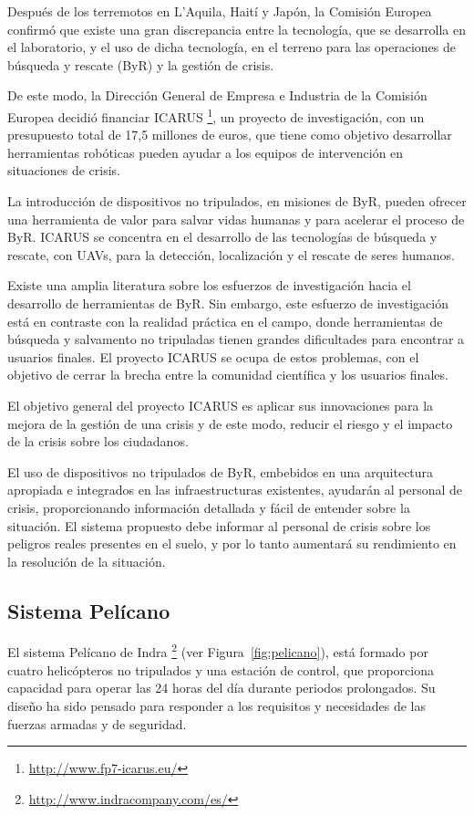 Después de los terremotos en L'Aquila, Haití y Japón, la Comisión Europea confirmó que existe una gran discrepancia entre la tecnología, que se desarrolla en el laboratorio, y el uso de dicha tecnología, en el terreno para las operaciones de búsqueda y rescate (\acs{ByR}) y la gestión de crisis.

De este modo, la Dirección General de Empresa e Industria de la Comisión Europea decidió financiar ICARUS \footnote{\url{http://www.fp7-icarus.eu/}}, un proyecto de investigación, con un presupuesto total de 17,5 millones de euros, que tiene como objetivo desarrollar herramientas robóticas pueden ayudar a los equipos de intervención en situaciones de crisis.

La introducción de dispositivos no tripulados, en misiones de \acs{ByR}, pueden ofrecer una herramienta de valor para salvar vidas humanas y para acelerar el proceso de \acs{ByR}. ICARUS se concentra en el desarrollo de las tecnologías de búsqueda y rescate, con \acs{UAV}s, para la detección, localización y el rescate de seres humanos.

Existe una amplia literatura sobre los esfuerzos de investigación hacia el desarrollo de herramientas de \acs{ByR}. Sin embargo, este esfuerzo de investigación está en contraste con la realidad práctica en el campo, donde herramientas de búsqueda y salvamento no tripuladas tienen grandes dificultades para encontrar a usuarios finales. El proyecto ICARUS se ocupa de estos problemas, con el objetivo de cerrar la brecha entre la comunidad científica y los usuarios finales.

El objetivo general del proyecto ICARUS es aplicar sus innovaciones para la mejora de la gestión de una crisis y de este modo, reducir el riesgo y el impacto de la crisis sobre los ciudadanos. 

El uso de dispositivos no tripulados de \acs{ByR}, embebidos en una arquitectura apropiada e integrados en las infraestructuras existentes, ayudarán al personal de crisis, proporcionando información detallada y fácil de entender sobre la situación. El sistema propuesto debe informar al personal de crisis sobre los peligros reales presentes en el suelo, y por lo tanto aumentará su rendimiento en la resolución de la situación.

\subsection{Sistema Pelícano}
\label{sec:pelicano}

El sistema Pelícano de Indra \footnote{\url{http://www.indracompany.com/es/}} (ver Figura~\ref{fig:pelicano}), está formado por cuatro helicópteros no tripulados y una estación de control, que proporciona capacidad para operar las 24 horas del día durante periodos prolongados. Su diseño ha sido pensado para responder a los requisitos y necesidades de las fuerzas armadas y de seguridad.

